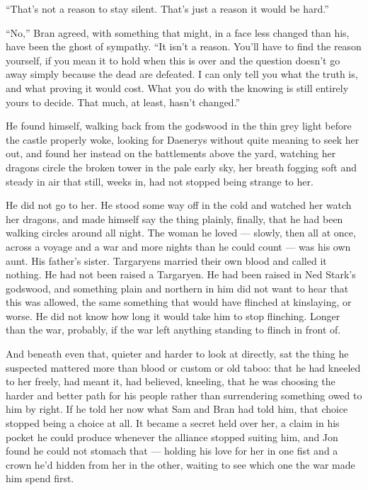 “That’s not a reason to stay silent. That’s just a reason it would be hard.”

“No,” Bran agreed, with something that might, in a face less changed than his, have been the ghost of sympathy. “It isn’t a reason. You’ll have to find the reason yourself, if you mean it to hold when this is over and the question doesn’t go away simply because the dead are defeated. I can only tell you what the truth is, and what proving it would cost. What you do with the knowing is still entirely yours to decide. That much, at least, hasn’t changed.”

\sceneBreak

He found himself, walking back from the godswood in the thin grey light before the castle properly woke, looking for Daenerys without quite meaning to seek her out, and found her instead on the battlements above the yard, watching her dragons circle the broken tower in the pale early sky, her breath fogging soft and steady in air that still, weeks in, had not stopped being strange to her.

He did not go to her. He stood some way off in the cold and watched her watch her dragons, and made himself say the thing plainly, finally, that he had been walking circles around all night. The woman he loved — slowly, then all at once, across a voyage and a war and more nights than he could count — was his own aunt. His father’s sister. Targaryens married their own blood and called it nothing. He had not been raised a Targaryen. He had been raised in Ned Stark’s godswood, and something plain and northern in him did not want to hear that this was allowed, the same something that would have flinched at kinslaying, or worse. He did not know how long it would take him to stop flinching. Longer than the war, probably, if the war left anything standing to flinch in front of.

And beneath even that, quieter and harder to look at directly, sat the thing he suspected mattered more than blood or custom or old taboo: that he had kneeled to her freely, had meant it, had believed, kneeling, that he was choosing the harder and better path for his people rather than surrendering something owed to him by right. If he told her now what Sam and Bran had told him, that choice stopped being a choice at all. It became a secret held over her, a claim in his pocket he could produce whenever the alliance stopped suiting him, and Jon found he could not stomach that — holding his love for her in one fist and a crown he’d hidden from her in the other, waiting to see which one the war made him spend first.

